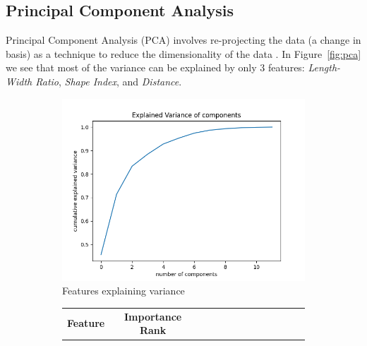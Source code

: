 \documentclass[letterpaper]{article}
\begin{document}
{ 
\subsection{Principal Component Analysis}
Principal Component Analysis (PCA) involves re-projecting the data (a change in basis) as a technique to reduce the dimensionality of the data \cite{Muller2016-ui}.  In Figure~\ref{fig:pca} we see that most of the variance can be explained by only 3 features: {\it Length-Width Ratio}, {\it Shape Index}, and {\it Distance}.
\begin{figure}[H]
\centering
\begin{subfigure}[]{.32\textwidth}
	  \centering
	  \includegraphics[width=1\linewidth]{figures/explained-variance}
	  \caption{Features explaining variance}
\end{subfigure}
\begin{subfigure}{.32\textwidth}
  \centering
	{
	\centering\settowidth{}
	\renewcommand\theadalign{cl}\renewcommand\cellalign{cl}
	\renewcommand\theadfont{\bfseries}
	\renewcommand\tabcolsep{4pt}\renewcommand\arraystretch{1.25}
	\footnotesize
	\begin{longtable}[c]{
	    |l |*{12}{c |} }%
	    \hline
	    {\textbf{Feature}} & {\textbf{Importance Rank}}\\

\end{longtable}}
\end{subfigure}
\end{figure}}
\end{document}
